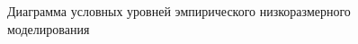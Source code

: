 


\begin{figure}[ht]
    \caption{Диаграмма условных уровней эмпирического низкоразмерного моделирования}\label{fig:ROM-II}
\end{figure}


